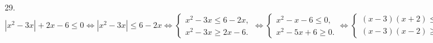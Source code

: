 29. $|x^2-3x|+2x-6\leqslant0\Leftrightarrow|x^2-3x|\leqslant6-2x\Leftrightarrow \begin{cases} x^2-3x\leqslant6-2x,\\ x^2-3x\geqslant2x-6.\end{cases}
\Leftrightarrow \begin{cases} x^2-x-6\leqslant0,\\ x^2-5x+6\geqslant0.\end{cases}
\Leftrightarrow \begin{cases} (x-3)(x+2)\leqslant0,\\ (x-3)(x-2)\geqslant0.\end{cases}
\Leftrightarrow \begin{cases} x\in[-2;3],\\ x\in(-\infty;2]\cup[3;+\infty).\end{cases}\Leftrightarrow x \in [-2;2]\cup\{3\}.$\newpage\noindent
